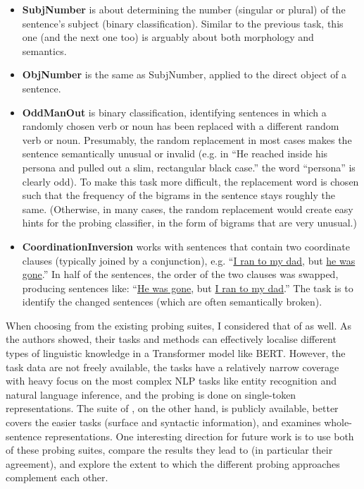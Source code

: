 \documentclass[bsc,frontabs,twoside,singlespacing,parskip,deptreport]{infthesis}
\begin{document}
{{\begin{enumerate}
{\begin{itemize}
          \item \textbf{SubjNumber} is about determining the number (singular or plural) of the sentence's subject (binary classification). Similar to the previous task, this one (and the next one too) is arguably about both morphology and semantics.
          \item \textbf{ObjNumber} is the same as SubjNumber, applied to the direct object of a sentence.
          \item \textbf{OddManOut} is binary classification, identifying sentences in which a randomly chosen verb or noun has been replaced with a different random verb or noun. Presumably, the random replacement in most cases makes the sentence semantically unusual or invalid (e.g. in ``He reached inside his persona and pulled out a slim, rectangular black case.'' the word ``persona'' is clearly odd). To make this task more difficult, the replacement word is chosen such that the frequency of the bigrams in the sentence stays roughly the same. (Otherwise, in many cases, the random replacement would create easy hints for the probing classifier, in the form of bigrams that are very unusual.)
          \item \textbf{CoordinationInversion} works with sentences that contain two coordinate clauses (typically joined by a conjunction), e.g. ``\underline{I ran to my dad}, but \underline{he was gone}.'' In half of the sentences, the order of the two clauses was swapped, producing sentences like: ``\underline{He was gone}, but \underline{I ran to my dad}.'' The task is to identify the changed sentences (which are often semantically broken).
        \end{itemize}
      }
    \end{enumerate}

    When choosing from the existing probing suites, I considered that of \citet{Tenney_2019b} as well. As the authors showed, their tasks and methods can effectively localise different types of linguistic knowledge in a Transformer model like BERT.
    However, the task data are not freely available, the tasks have a relatively narrow coverage with heavy focus on the most complex NLP tasks like entity recognition and natural language inference, and the probing is done on single-token representations.
    The suite of \citeauthor{Conneau_2018}, on the other hand, is publicly available, better covers the easier tasks (surface and syntactic information), and examines whole-sentence representations.
    One interesting direction for future work is to use both of these probing suites, compare the results they lead to (in particular their agreement), and explore the extent to which the different probing approaches complement each other.
  }

}
\end{document}

